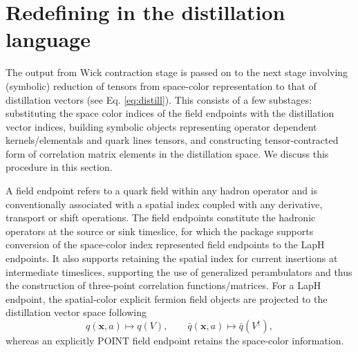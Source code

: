 \documentclass[a4paper,fleqn]{cas-dc}
\begin{document}
\section{Redefining in the distillation language}
\label{sec:distillation_lowering}
The output from Wick contraction stage is passed on to the next stage involving (symbolic) reduction of tensors from space-color representation to that of distillation vectors (see Eq. \ref{eq:distill}). This consists of a few substages: substituting the space color indices of the field endpoints with the distillation vector indices, building symbolic objects representing operator dependent kernels/elementals and quark lines tensors, and constructing tensor-contracted form of correlation matrix elements in the distillation space. We discuss this procedure in this section. 

A field endpoint refers to a quark field within any hadron operator and is conventionally associated with a spatial index coupled with any derivative, transport or shift operations. The field endpoints constitute the hadronic operators at the source or sink timeslice, for which the package supports conversion of the space-color index represented field endpoints to the LapH endpoints. It also supports retaining the spatial index for current insertions at intermediate timeslices, supporting the use of generalized perambulators and thus the construction of three-point correlation functions/matrices. For a LapH endpoint, the spatial-color explicit fermion field objects are projected to the distillation vector space following
\begin{equation}
q(\mathbf x, a) \longmapsto q(V),
\qquad
\bar q(\mathbf x, a) \longmapsto \bar q(V^\dagger),
\label{eq:laph_endpoint_realization}
\end{equation}
whereas an explicitly POINT field endpoint retains the space-color information. 
\end{document}
